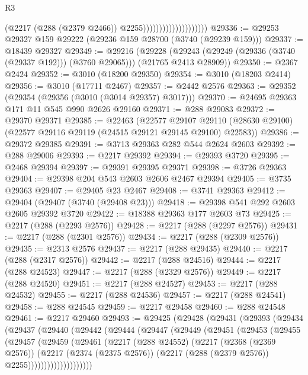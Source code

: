 \begin{lexlean}{R3}
\begin{coremodule}
                                          (@2217 (@288 (@2379 @2466)) @2255))))))))))))))))))))
@29336 := @29253 @29327 @159 @29222 (@29236 @159 @28700 (@3740 (@29239 @159)))
@29337 := @18439 @29327
@29349 := @29216
    (@29228 (@29243 (@29249 (@29336 (@3740 (@29337 @192))) (@3760 @29065))) (@21765 @2413 @28909))
@29350 := @2367 @2424
@29352 := @3010 (@18200 @29350)
@29354 := @3010 (@18203 @2414)
@29356 := @3010 (@17711 @2467)
@29357 := @2442 @2576
@29363 := @29352 (@29354 (@29356 (@3010 (@3014 @29357) @3017)))
@29370 := @24695 @29363 @171 @11 @545 @990 @2626 @29160
@29371 := @288 @29083
@29372 := @29370 @29371
@29385 := @22463
    (@22577
      @29107
      @29110
      (@28630 @29100)
      (@22577 @29116 @29119 (@24515 @29121 @29145 @29100) @22583))
@29386 := @29372 @29385
@29391 := @3713 @29363 @282 @544 @2624 @2603
@29392 := @288 @29006
@29393 := @2217 @29392
@29394 := @29393 @3720
@29395 := @2468 @29394
@29397 := @29391 @29395 @29371
@29398 := @3726 @29363
@29404 := @29398 @204 @543 @2603 @2606 @2467 @29394
@29405 := @3735 @29363
@29407 := @29405 @23 @2467
@29408 := @3741 @29363
@29412 := @29404 (@29407 (@3740 (@29408 @23)))
@29418 := @29398 @541 @292 @2603 @2605 @29392 @3720
@29422 := @18388 @29363 @177 @2603 @73
@29425 := @2217 (@288 (@2293 @2576))
@29428 := @2217 (@288 (@2297 @2576))
@29431 := @2217 (@288 (@2301 @2576))
@29434 := @2217 (@288 (@2309 @2576))
@29435 := @2313 @2576
@29437 := @2217 (@288 @29435)
@29440 := @2217 (@288 (@2317 @2576))
@29442 := @2217 (@288 @24516)
@29444 := @2217 (@288 @24523)
@29447 := @2217 (@288 (@2329 @2576))
@29449 := @2217 (@288 @24520)
@29451 := @2217 (@288 @24527)
@29453 := @2217 (@288 @24532)
@29455 := @2217 (@288 @24536)
@29457 := @2217 (@288 @24541)
@29458 := @288 @24545
@29459 := @2217 @29458
@29460 := @288 @24548
@29461 := @2217 @29460
@29493 := @29425
    (@29428
      (@29431
        (@29393
          (@29434
            (@29437
              (@29440
                (@29442
                  (@29444
                    (@29447
                      (@29449
                        (@29451
                          (@29453
                            (@29455
                              (@29457
                                (@29459
                                  (@29461
                                    (@2217
                                      (@288 @24552)
                                      (@2217
                                        (@2368 (@2369 @2576))
                                        (@2217
                                          (@2374 (@2375 @2576))
                                          (@2217 (@288 (@2379 @2576)) @2255))))))))))))))))))))

\end{coremodule}
\end{lexlean}
